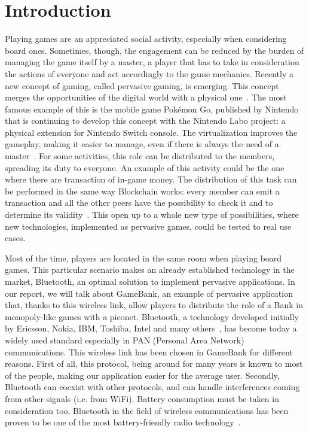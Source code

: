 \section{Introduction}
\label{introduction}

Playing games are an appreciated social activity, especially when considering 
board ones. 
Sometimes, though, the engagement can be reduced by the burden of managing the 
game itself by a master, a player that has to take in consideration the actions 
of everyone and act accordingly to the game mechanics. Recently a new concept 
of gaming, called pervasive gaming, is emerging. This concept merges the 
opportunities of the digital world with a physical one~\cite{arango17}. The 
most famous example of this is the mobile game Pokémon Go, published by 
Nintendo that is continuing to develop this concept with the Nintendo Labo 
project: a physical extension for Nintendo Switch console.
The virtualization improves the gameplay, making it easier to manage, even if 
there is always the need of a master~\cite{bjork01}.
For some activities, this role can be distributed to the members, spreading its 
duty to everyone. An example of this activity could be the one where there are 
transaction of in-game money. The distribution of this task can be performed in 
the same way Blockchain works: every member can emit a transaction and all the 
other peers have the possibility to check it and to determine its 
validity~\cite{nakamoto08}. This open up to a whole new type of possibilities, 
where new technologies, implemented as pervasive games, could be tested to real 
use cases.

Most of the time, players are located in the same room when playing board 
games. This particular scenario makes an already established technology in 
the market, Bluetooth, an optimal solution to implement pervasive applications. 
In our report, we will talk about GameBank, an example of pervasive application 
that, thanks to this wireless link, allow players to distribute the role of a 
Bank in monopoly-like games with a piconet.
Bluetooth, a technology developed initially by Ericsson, Nokia, IBM, Toshiba, 
Intel and many others~\cite{haartsen00}, has become today a widely used
standard especially in PAN (Personal Area Network) communications. This
wireless link has been chosen in GameBank for different reasons. First of all,
this protocol, being around for many years is known to most of the people,
making our application easier for the average user. Secondly, Bluetooth can
coexist with other protocols, and can handle interferences coming from other
signals (i.e. from WiFi). Battery consumption must be taken in consideration 
too, Bluetooth in the field of wireless communications has been proven to be 
one of the most battery-friendly radio technology~\cite{lee07}.

